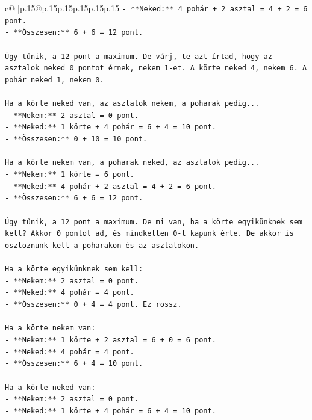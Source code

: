 \documentclass{article}
\begin{document}
{\begin{supertabular}{c@{$\;$}|p{.15\linewidth}@{}p{.15\linewidth}p{.15\linewidth}p{.15\linewidth}p{.15\linewidth}p{.15\linewidth}}
{{{\texttt{{-} **Neked:** 4 pohár + 2 asztal = 4 + 2 = 6 pont.} \\
\texttt{{-} **Összesen:** 6 + 6 = 12 pont.} \\
\\ 
\texttt{Úgy tűnik, a 12 pont a maximum. De várj, te azt írtad, hogy az asztalok neked 0 pontot érnek, nekem 1{-}et. A körte neked 4, nekem 6. A pohár neked 1, nekem 0.} \\
\\ 
\texttt{Ha a körte neked van, az asztalok nekem, a poharak pedig...} \\
\texttt{{-} **Nekem:** 2 asztal = 0 pont.} \\
\texttt{{-} **Neked:** 1 körte + 4 pohár = 6 + 4 = 10 pont.} \\
\texttt{{-} **Összesen:** 0 + 10 = 10 pont.} \\
\\ 
\texttt{Ha a körte nekem van, a poharak neked, az asztalok pedig...} \\
\texttt{{-} **Nekem:** 1 körte = 6 pont.} \\
\texttt{{-} **Neked:** 4 pohár + 2 asztal = 4 + 2 = 6 pont.} \\
\texttt{{-} **Összesen:** 6 + 6 = 12 pont.} \\
\\ 
\texttt{Úgy tűnik, a 12 pont a maximum. De mi van, ha a körte egyikünknek sem kell? Akkor 0 pontot ad, és mindketten 0{-}t kapunk érte. De akkor is osztoznunk kell a poharakon és az asztalokon.} \\
\\ 
\texttt{Ha a körte egyikünknek sem kell:} \\
\texttt{{-} **Nekem:** 2 asztal = 0 pont.} \\
\texttt{{-} **Neked:** 4 pohár = 4 pont.} \\
\texttt{{-} **Összesen:** 0 + 4 = 4 pont. Ez rossz.} \\
\\ 
\texttt{Ha a körte nekem van:} \\
\texttt{{-} **Nekem:** 1 körte + 2 asztal = 6 + 0 = 6 pont.} \\
\texttt{{-} **Neked:** 4 pohár = 4 pont.} \\
\texttt{{-} **Összesen:** 6 + 4 = 10 pont.} \\
\\ 
\texttt{Ha a körte neked van:} \\
\texttt{{-} **Nekem:** 2 asztal = 0 pont.} \\
\texttt{{-} **Neked:** 1 körte + 4 pohár = 6 + 4 = 10 pont.} \\
}}}
\end{supertabular}}
\end{document}
